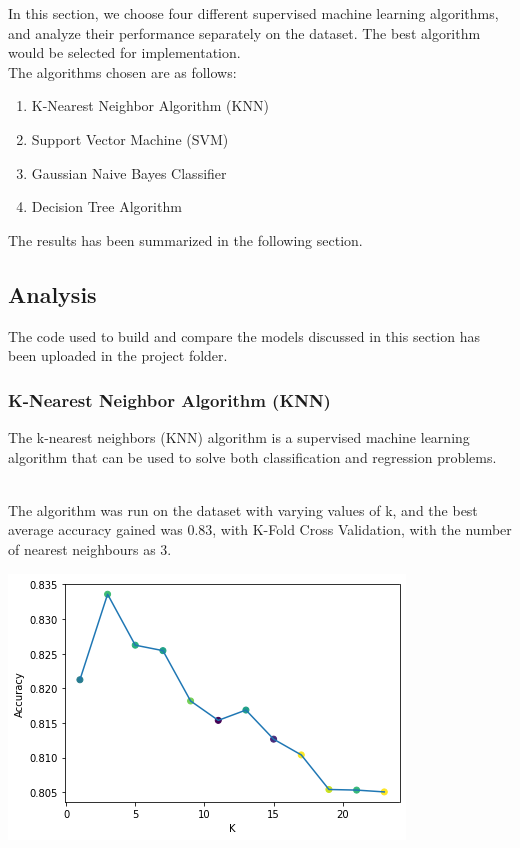 In this section, we choose four different supervised machine learning algorithms, and analyze their performance separately on the dataset. The best algorithm would be selected for implementation. \\

The algorithms chosen are as follows:

\begin{enumerate}
\item K-Nearest Neighbor Algorithm (KNN)
\item Support Vector Machine (SVM)
\item Gaussian Naive Bayes Classifier
\item Decision Tree Algorithm
\end{enumerate}

The results has been summarized in the following section. 

\subsection{Analysis}

The code used to build and compare the models discussed in this section has been uploaded in the project folder.

\subsubsection{K-Nearest Neighbor Algorithm (KNN)}

The k-nearest neighbors (KNN) algorithm is a supervised machine learning algorithm that can be used to solve both classification and regression problems. 

\\The algorithm was run on the dataset with varying values of k, and the best average accuracy gained was 0.83, with K-Fold Cross Validation, with the number of nearest neighbours as 3. \\

\begin{Figure}
  \includegraphics[width=\linewidth]{images/knn-accuracy.png}
  \label{fig:knnvaryingk}
\end{Figure}

